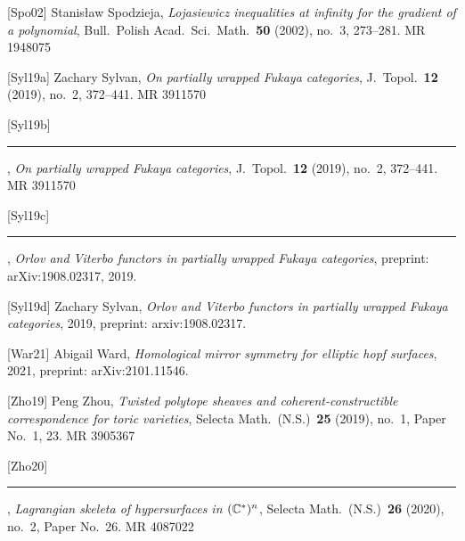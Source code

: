 [Spo02] Stanis{\l}aw Spodzieja, \emph{Lojasiewicz inequalities at infinity for the
gradient of a polynomial}, Bull.\ Polish Acad.\ Sci.\ Math.\ \textbf{50} (2002), no.~3,
273--281. MR 1948075

[Syl19a] Zachary Sylvan, \emph{On partially wrapped Fukaya categories}, J.\ Topol.\
\textbf{12} (2019), no.~2, 372--441. MR 3911570

[Syl19b] \rule[0.4ex]{2.6em}{0.4pt} , \emph{On partially wrapped Fukaya categories},
J.\ Topol.\ \textbf{12} (2019), no.~2, 372--441. MR 3911570


[Syl19c] \rule[0.4ex]{2.6em}{0.4pt} , \emph{Orlov and Viterbo functors in partially
wrapped Fukaya categories}, preprint: arXiv:1908.02317, 2019.

[Syl19d] Zachary Sylvan, \emph{Orlov and Viterbo functors in partially wrapped Fukaya
categories}, 2019, preprint: arxiv:1908.02317.

[War21] Abigail Ward, \emph{Homological mirror symmetry for elliptic hopf surfaces},
2021, preprint: arXiv:2101.11546.

[Zho19] Peng Zhou, \emph{Twisted polytope sheaves and coherent-constructible
correspondence for toric varieties}, Selecta Math.\ (N.S.)\ \textbf{25} (2019), no.~1,
Paper No.~1, 23. MR 3905367

[Zho20] \rule[0.4ex]{2.6em}{0.4pt} , \emph{Lagrangian skeleta of hypersurfaces in
$(\mathbb{C}^*)^n$}, Selecta Math.\ (N.S.)\ \textbf{26} (2020), no.~2, Paper No.~26.
MR 4087022

\endgroup
